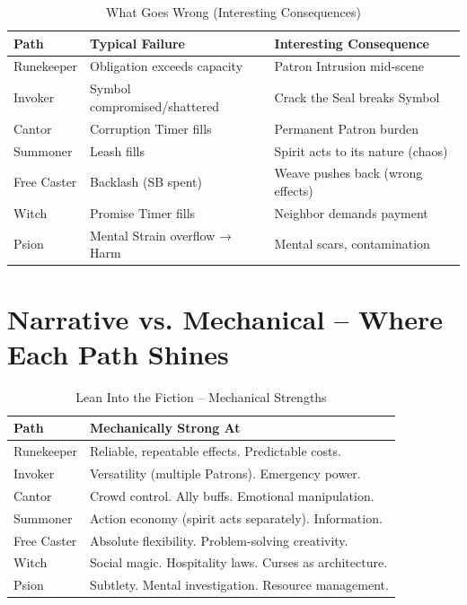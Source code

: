 \documentclass[10pt,a5paper]{book}
\begin{document}
\small
\begin{longtable}{p{2.5cm} p{4cm} p{4.5cm}}
\caption{What Goes Wrong (Interesting Consequences)}\\
\toprule
\textbf{Path} & \textbf{Typical Failure} & \textbf{Interesting Consequence} \\
\midrule
Runekeeper & Obligation exceeds capacity & Patron Intrusion mid-scene \\
Invoker & Symbol compromised/shattered & Crack the Seal breaks Symbol \\
Cantor & Corruption Timer fills & Permanent Patron burden \\
Summoner & Leash fills & Spirit acts to its nature (chaos) \\
Free Caster & Backlash (SB spent) & Weave pushes back (wrong effects) \\
Witch & Promise Timer fills & Neighbor demands payment \\
Psion & Mental Strain overflow → Harm & Mental scars, contamination \\
\bottomrule
\end{longtable}
\normalsize

\section*{Narrative vs. Mechanical -- Where Each Path Shines}

\small
\begin{longtable}{p{2.5cm} p{5cm}}
\caption{Lean Into the Fiction -- Mechanical Strengths}\\
\toprule
\textbf{Path} & \textbf{Mechanically Strong At} \\
\midrule
Runekeeper & Reliable, repeatable effects. Predictable costs. \\
Invoker & Versatility (multiple Patrons). Emergency power. \\
Cantor & Crowd control. Ally buffs. Emotional manipulation. \\
Summoner & Action economy (spirit acts separately). Information. \\
Free Caster & Absolute flexibility. Problem-solving creativity. \\
Witch & Social magic. Hospitality laws. Curses as architecture. \\
Psion & Subtlety. Mental investigation. Resource management. \\
\bottomrule
\end{longtable}
\end{document}
